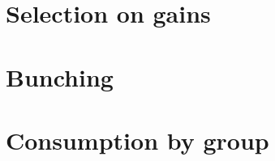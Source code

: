 \documentclass[12pt]{article}
\begin{document}
\begin{appendices}
\section{Selection on gains}

\setcounter{figure}{0}

  \label{appendix:appendix_savings}

  

  \clearpage

\section{Bunching}

  \setcounter{figure}{0}

  \label{appendix:appendix_bunching}

  

\clearpage

\section{Consumption by group}

  \setcounter{figure}{0}

  \label{appendix:consumptionByGroup}

  

\clearpage

\end{appendices}
\end{document}
